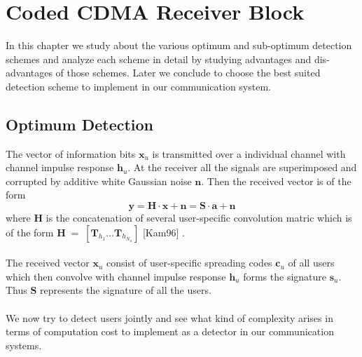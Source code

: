\chapter{Coded CDMA Receiver Block}
In this chapter we study about the various optimum and sub-optimum detection schemes and analyze each scheme in detail by studying advantages and dis-advantages of those schemes. Later we conclude to choose the best suited detection scheme to implement in our communication system.
\section{Optimum Detection}
The vector of information bits $\mathrm{\mathbf{x}}_u$ is transmitted over a individual channel with channel impulse response $\mathrm{\mathbf{h}}_u$. At the receiver all the signals are superimposed and corrupted by additive white Gaussian noise $\mathrm{\mathbf{n}}$. Then the received vector is of the form
\begin{equation}
\mathrm{\mathbf{y}}=\mathrm{\mathbf{H}}\cdot\mathrm{\mathbf{x}}+\mathrm{\mathbf{n}}=\mathrm{\mathbf{S}}\cdot\mathrm{\mathbf{a}}+\mathrm{\mathbf{n}}
\end{equation}
where $\mathrm{\mathbf{H}}$ is the concatenation of several user-specific convolution matric which is of the form $\mathrm{\mathbf{H}}\;=\;[\mathrm{\mathbf{T}}_{h_1}\dots\mathrm{\mathbf{T}}_{h_{N_u}}]$ [Kam96] .\\\\
The received vector $\mathrm{\mathbf{x}}_u$ consist of user-specific spreading codes $\mathrm{\mathbf{c}}_u$ of all users which then convolve with channel impulse response $\mathrm{\mathbf{h}}_u$ forms the signature $\mathrm{\mathbf{s}}_u$. Thus $\mathrm{\mathbf{S}}$ represents the signature of all the users.\\ \\
We now try to detect users jointly and see what kind of complexity arises in terms of computation cost to implement as a detector in our communication systems.
